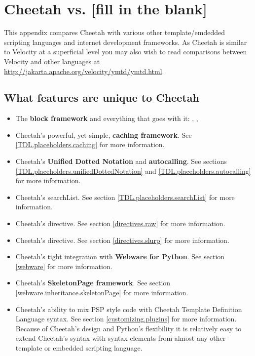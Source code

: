 \section{Cheetah vs. [fill in the blank]}
\label{comparisons}

This appendix compares Cheetah with various other template/emdedded scripting
languages and internet development frameworks.  As Cheetah is similar to
Velocity at a superficial level you may also wish to read comparisons between
Velocity and other languages at
\url{http://jakarta.apache.org/velocity/ymtd/ymtd.html}.

\subsection{What features are unique to Cheetah}
\label{comparisons.unique}

\begin{itemize}
\item The {\bf block framework} and everything that goes with it: ,
     , 
\item Cheetah's powerful, yet simple, {\bf caching framework}. See
     \ref{TDL.placeholders.caching} for more information.
\item Cheetah's {\bf Unified Dotted Notation} and {\bf autocalling}. See
     sections \ref{TDL.placeholders.unifiedDottedNotation} and
     \ref{TDL.placeholders.autocalling} for more information.
\item Cheetah's searchList. See section \ref{TDL.placeholders.searchList} for more
     information.
\item Cheetah's  directive.  See section \ref{directives.raw} for more
     information.
\item Cheetah's  directive.  See section \ref{directives.slurp} for more
     information.
\item Cheetah's tight integration with {\bf Webware for Python}.  See section
     \ref{webware} for more information.
\item Cheetah's {\bf SkeletonPage framework}.  See section
     \ref{webware.inheritance.skeletonPage} for more information.
\item Cheetah's ability to mix PSP style code with Cheetah Template Definition
     Language syntax.  See section \ref{customizing.plugins} for more
     information.  Because of Cheetah's design and Python's flexibility it is
     relatively easy to extend Cheetah's syntax with syntax elements from almost
     any other template or embedded scripting language.
\end{itemize}

